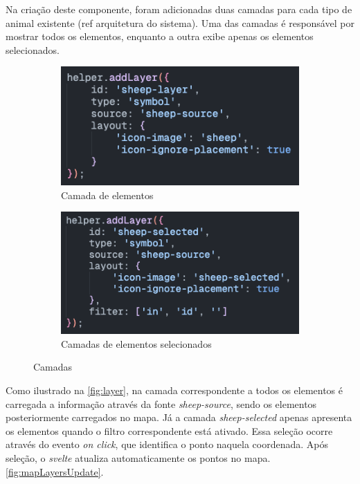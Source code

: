 Na criação deste componente, foram adicionadas duas camadas para cada tipo de animal existente (ref arquitetura do sistema). Uma das camadas é responsável por mostrar todos os elementos, enquanto a outra exibe apenas os elementos selecionados.

\begin{figure}[!h]
	\centering
	\begin{subfigure}[c]{0.40\textwidth}
		\centering
		\includegraphics[width=\textwidth]{figs/layer.png}
		\caption{Camada de elementos}
		\label{fig:layer}
	\end{subfigure}
	\hfill
	\begin{subfigure}[c]{0.40\textwidth}
		\centering
		\includegraphics[width=\textwidth]{figs/selected_layer.png}
		\caption{Camadas de elementos selecionados}
		\label{fig:selected_layer}
	\end{subfigure}
	\caption{Camadas}
    \label{fig:layers}
\end{figure}

Como ilustrado na \autoref{fig:layer}, na camada correspondente a todos os elementos é carregada a informação através da fonte \textit{sheep-source}, sendo os elementos posteriormente carregados no mapa. Já a camada \textit{sheep-selected} apenas apresenta os elementos quando o filtro correspondente está ativado. Essa seleção ocorre através do evento \textit{on click}, que identifica o ponto naquela coordenada. Após seleção, o \textit{svelte} atualiza automaticamente os pontos no mapa. \autoref{fig:mapLayersUpdate}.

